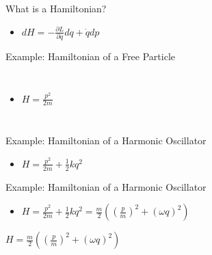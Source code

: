 \documentclass[10pt,xcolor={table,dvipsnames},t]{beamer}
\begin{document}
\begin{frame}{What is a Hamiltonian?}
    \begin{itemize}
        \item $dH = -\frac{\partial L}{\partial q}  d q + \dot{q} dp $
    \end{itemize}
\end{frame}

\begin{frame}{Example: Hamiltonian of a Free Particle}
\begin{columns}[c]
        \begin{itemize}
        \item $H = \frac{p^2}{2m}$
    \end{itemize}
    \begin{figure}
        \centering
        \label{fig:my_label}
    \end{figure}
\end{columns}

\end{frame}

\begin{frame}{Example: Hamiltonian of a Harmonic Oscillator}
        \begin{itemize}
            \item $H = \frac{p^2}{2m} + \frac{1}{2}kq^2 $
        \end{itemize}
\end{frame}

\begin{frame}{Example: Hamiltonian of a Harmonic Oscillator}
       \begin{itemize}
        \item $H = \frac{p^2}{2m} + \frac{1}{2}kq^2 = \frac{m}{2}\left(\left(\frac{p}{m}\right)^2 + (\omega q)^2 \right)$
        \end{itemize}
\end{frame}

\begin{frame}{$H =\frac{m}{2}\left(\left(\frac{p}{m}\right)^2 + (\omega q)^2 \right)$}
    \vspace{-10pt}
    \begin{figure}
        \label{fig:my_label}
    \end{figure}
\end{frame}
\end{document}
